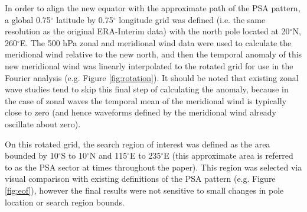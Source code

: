 In order to align the new equator with the approximate path of the PSA pattern, a global 0.75$^{\circ}$ latitude by 0.75$^{\circ}$ longitude grid was defined (i.e. the same resolution as the original ERA-Interim data) with the north pole located at 20$^{\circ}$N, 260$^{\circ}$E. The 500 hPa zonal and meridional wind data were used to calculate the meridional wind relative to the new north, and then the temporal anomaly of this new meridional wind was linearly interpolated to the rotated grid for use in the Fourier analysis (e.g. Figure \ref{fig:rotation}). It should be noted that existing zonal wave studies \citep[e.g.][]{IrvingSimmonds2015} tend to skip this final step of calculating the anomaly, because in the case of zonal waves the temporal mean of the meridional wind is typically close to zero (and hence waveforms defined by the meridional wind already oscillate about zero). 

On this rotated grid, the search region of interest was defined as the area bounded by 10$^{\circ}$S to 10$^{\circ}$N and 115$^{\circ}$E to 235$^{\circ}$E (this approximate area is referred to as the PSA sector at times throughout the paper). This region was selected via visual comparison with existing definitions of the PSA pattern (e.g. Figure \ref{fig:eof}), however the final results were not sensitive to small changes in pole location or search region bounds.

